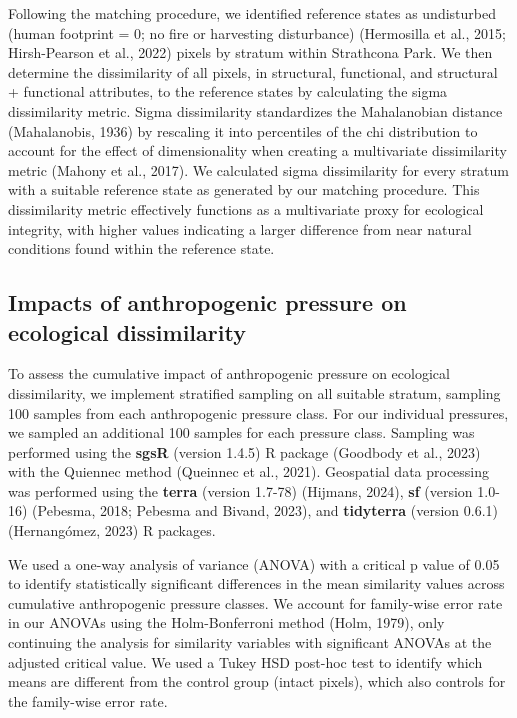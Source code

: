 \documentclass[
]{agujournal2019}
\begin{document}
Following the matching procedure, we identified reference states as
undisturbed (human footprint = 0; no fire or harvesting disturbance)
(Hermosilla et al., 2015; Hirsh-Pearson et al., 2022) pixels by stratum
within Strathcona Park. We then determine the dissimilarity of all
pixels, in structural, functional, and structural + functional
attributes, to the reference states by calculating the sigma
dissimilarity metric. Sigma dissimilarity standardizes the Mahalanobian
distance (Mahalanobis, 1936) by rescaling it into percentiles of the chi
distribution to account for the effect of dimensionality when creating a
multivariate dissimilarity metric (Mahony et al., 2017). We calculated
sigma dissimilarity for every stratum with a suitable reference state as
generated by our matching procedure. This dissimilarity metric
effectively functions as a multivariate proxy for ecological integrity,
with higher values indicating a larger difference from near natural
conditions found within the reference state.

\subsection{Impacts of anthropogenic pressure on ecological
dissimilarity}\label{impacts-of-anthropogenic-pressure-on-ecological-dissimilarity}

To assess the cumulative impact of anthropogenic pressure on ecological
dissimilarity, we implement stratified sampling on all suitable stratum,
sampling 100 samples from each anthropogenic pressure class. For our
individual pressures, we sampled an additional 100 samples for each
pressure class. Sampling was performed using the \textbf{sgsR} (version
1.4.5) R package (Goodbody et al., 2023) with the Quiennec method
(Queinnec et al., 2021). Geospatial data processing was performed using
the \textbf{terra} (version 1.7-78) (Hijmans, 2024), \textbf{sf}
(version 1.0-16) (Pebesma, 2018; Pebesma and Bivand, 2023), and
\textbf{tidyterra} (version 0.6.1) (Hernangómez, 2023) R packages.

We used a one-way analysis of variance (ANOVA) with a critical p value
of 0.05 to identify statistically significant differences in the mean
similarity values across cumulative anthropogenic pressure classes. We
account for family-wise error rate in our ANOVAs using the
Holm-Bonferroni method (Holm, 1979), only continuing the analysis for
similarity variables with significant ANOVAs at the adjusted critical
value. We used a Tukey HSD post-hoc test to identify which means are
different from the control group (intact pixels), which also controls
for the family-wise error rate.
\end{document}

